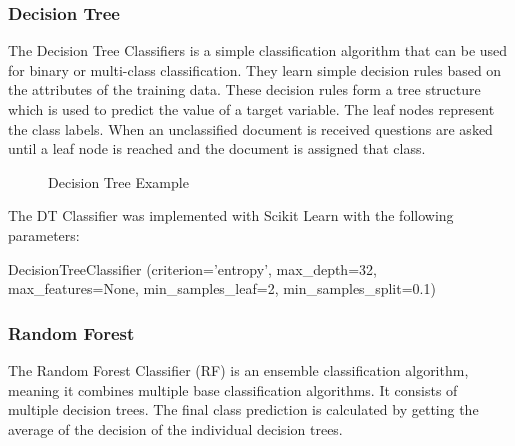 \subsubsection*{Decision Tree}

The Decision Tree Classifiers is a simple classification algorithm that can be used for binary or multi-class classification. They learn simple decision rules based on the attributes of the training data. These decision rules form a tree structure which is used to predict the value of a target variable. The leaf nodes represent the class labels. When an unclassified document is received questions are asked until a leaf node is reached and the document is assigned that class.

\begin{figure}[h!]
\centering
{}
\caption{\label{fig:mlp} Decision Tree Example}
\end{figure}

The DT Classifier was implemented with Scikit Learn with the following parameters:

\begin{tcolorbox}
\begin{center}
	DecisionTreeClassifier (criterion='entropy', max\_depth=32, max\_features=None, min\_samples\_leaf=2, min\_samples\_split=0.1)
\end{center}
\end{tcolorbox}

\subsubsection*{Random Forest}


The Random Forest Classifier (RF) is an ensemble classification algorithm, meaning it combines multiple base classification algorithms. It consists of multiple decision trees. The final class prediction is calculated by getting the average of the decision of the individual decision trees.

